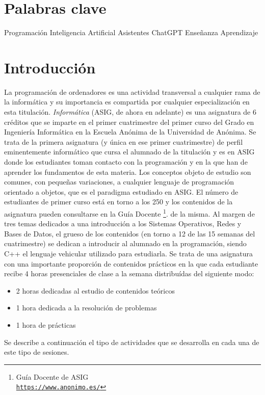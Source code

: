 \documentclass[twocolumn,twoside,a4paper, 10pt]{article}
\begin{document}
\section*{Palabras clave}
\noindent Programación Inteligencia Artificial Asistentes ChatGPT Enseñanza Aprendizaje

\section{Introducción}
La programación de ordenadores es una actividad transversal a cualquier rama de la informática y su
importancia es compartida por cualquier especialización en esta titulación.
\textit{Informática} 
(ASIG, de ahora en adelante) 
es una asignatura de 6 créditos que se imparte en el primer cuatrimestre 
del primer curso del Grado en Ingeniería Informática en la Escuela Anónima
de la Universidad de Anónima.
Se trata de la primera asignatura (y única en ese primer cuatrimestre) de perfil eminentemente informático que
cursa el alumnado de la titulación y es en ASIG donde los estudiantes toman
contacto con la programación y en la que han de aprender los fundamentos de esta materia.
Los conceptos objeto de estudio son comunes, con pequeñas variaciones, a cualquier lenguaje de programación
orientado a objetos, que es el paradigma estudiado en ASIG.
El número de estudiantes de primer curso está en torno a los 250 y los contenidos de la asignatura pueden 
consultarse en la Guía Docente
\footnote{Guía Docente de ASIG\\ \href{https://www.anonimo.es/}{\scriptsize{\texttt{https://www.anonimo.es/}}}}.
de la misma.
Al margen de tres temas dedicados a una introducción a los Sistemas Operativos, Redes y Bases de Datos,
el grueso de los contenidos (en torno a 12 de las 15 semanas del cuatrimestre) se dedican a introducir al
alumnado en la programación, siendo C++ el lenguaje vehicular utilizado para estudiarla.
Se trata de una asignatura con una importante proporción de contenidos prácticos en la que cada estudiante
recibe 4 horas presenciales de clase a la semana distribuídas del siguiente modo:
\begin{itemize}
  \item 2 horas dedicadas al estudio de contenidos teóricos
  \item 1 hora dedicada a la resolución de problemas
  \item 1 hora de prácticas
\end{itemize}
Se describe a continuación el tipo de actividades que se desarrolla en cada una de este tipo de sesiones.
\end{document}
